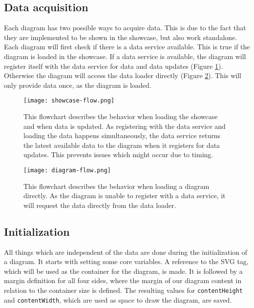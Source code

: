\subsection{Data acquisition} \label{sec:data-acquisition}
Each diagram has two possible ways to acquire data. This is due to the fact that they are implemented to be shown in the showcase, but also work standalone. Each diagram will first check if there is a data service available. This is true if the diagram is loaded in the showcase. If a data service is available, the diagram will register itself with the data service for data and data updates (Figure \ref{fig:showcase-flowchart}). Otherwise the diagram will access the data loader directly (Figure \ref{fig:diagram-flowchart}). This will only provide data once, as the diagram is loaded.

\begin{figure}[ht]
    \texttt{[image: showcase-flow.png]}
    \captionsetup{width=0.9\textwidth}
    \caption[showcase-flowchart]{This flowchart describes the behavior when loading the showcase and when data is updated. As registering with the data service and loading the data happens simultaneously, the data service returns the latest available data to the diagram when it registers for data updates. This prevents issues which might occur due to timing.}
    \label{fig:showcase-flowchart}
\end{figure}

\begin{figure}[ht]
    \texttt{[image: diagram-flow.png]}
    \captionsetup{width=0.9\textwidth}
    \caption[diagram-flowchart]{This flowchart describes the behavior when loading a diagram directly. As the diagram is unable to register with a data service, it will request the data directly from the data loader.}
    \label{fig:diagram-flowchart}
\end{figure}

\subsection{Initialization}\label{sec:initialization}
All things which are independent of the data are done during the initialization of a diagram. It starts with setting some core variables. A reference to the SVG tag, which will be used as the container for the diagram, is made. It is followed by a margin definition for all four sides, where the margin of our diagram content in relation to the container size is defined. The resulting values for \verb|contentHeight| and \verb|contentWidth|, which are used as space to draw the diagram, are saved. 

